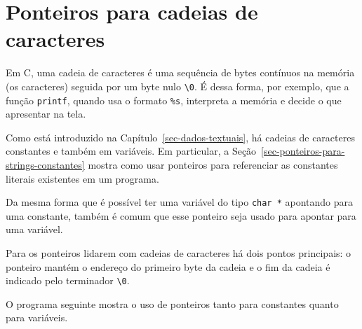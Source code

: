 \documentclass[
  11pt,
  a4paper,
]{scrbook}
\begin{document}
\section{Ponteiros para cadeias de
caracteres}\label{sec-ponteiros-para-cadeias-de-caracteres}

Em C, uma cadeia de caracteres é uma sequência de bytes contínuos na
memória (os caracteres) seguida por um byte nulo
\texttt{\textbackslash{}0}. É dessa forma, por exemplo, que a função
\texttt{printf}, quando usa o formato \texttt{\%s}, interpreta a memória
e decide o que apresentar na tela.

Como está introduzido na Capítulo~\ref{sec-dados-textuais}, há cadeias
de caracteres constantes e também em variáveis. Em particular, a
Seção~\ref{sec-ponteiros-para-strings-constantes} mostra como usar
ponteiros para referenciar as constantes literais existentes em um
programa.

Da mesma forma que é possível ter uma variável do tipo \texttt{char\ *}
apontando para uma constante, também é comum que esse ponteiro seja
usado para apontar para uma variável.

Para os ponteiros lidarem com cadeias de caracteres há dois pontos
principais: o ponteiro mantém o endereço do primeiro byte da cadeia e o
fim da cadeia é indicado pelo terminador \texttt{\textbackslash{}0}.

O programa seguinte mostra o uso de ponteiros tanto para constantes
quanto para variáveis.
\end{document}
